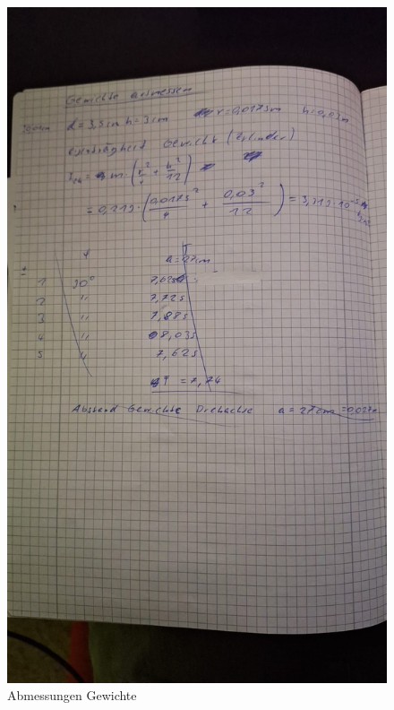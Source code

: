 \begin{figure}[h]
    \hfill
    \begin{minipage}{0.45\textwidth}
        \centering
        \includegraphics[width=\textwidth]{Bilder/messwerte2.jpg}
        \caption{Abmessungen Gewichte}
    \end{minipage}
    \hfill
    \begin{minipage}{0.45\textwidth}
        \centering

\end{minipage}
\end{figure}
